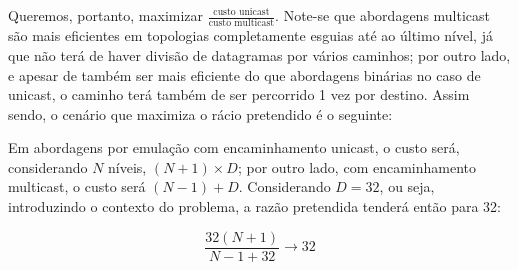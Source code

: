 \begin{enumerate}[leftmargin=\labelsep]
        Queremos, portanto, maximizar $\frac{\text{custo unicast}}{\text{custo multicast}}$.
        Note-se que abordagens multicast são mais eficientes em topologias
        completamente esguias até ao último nível, já que não terá de haver divisão
        de datagramas por vários caminhos; por outro lado, e apesar de
        também ser mais eficiente do que abordagens binárias no caso de unicast,
        o caminho terá também de ser percorrido 1 vez por destino. Assim sendo, o
        cenário que maximiza o rácio pretendido é o seguinte:

        \begin{figure}[h]
          \centering
          
        \end{figure}

        Em abordagens por emulação com encaminhamento unicast, o custo será, considerando
        $N$ níveis, $(N + 1) \times D$; por outro lado, com encaminhamento multicast,
        o custo será $(N - 1) + D$. Considerando $D = 32$, ou seja, introduzindo
        o contexto do problema, a razão pretendida tenderá então para 32:

        $$
          \frac{32(N + 1)}{N - 1 + 32} \to 32
        $$

\end{enumerate}
